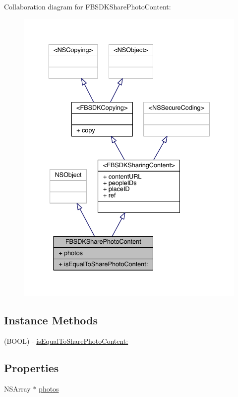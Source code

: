 Collaboration diagram for F\-B\-S\-D\-K\-Share\-Photo\-Content\-:
\nopagebreak
\begin{figure}[H]
\begin{center}
\leavevmode
\includegraphics[width=336pt]{interface_f_b_s_d_k_share_photo_content__coll__graph}
\end{center}
\end{figure}
\subsection*{Instance Methods}
\begin{DoxyCompactItemize}
\item 
(B\-O\-O\-L) -\/ \hyperlink{interface_f_b_s_d_k_share_photo_content_ace81b33c5411764eaa3fe442f533c34f}{is\-Equal\-To\-Share\-Photo\-Content\-:}
\end{DoxyCompactItemize}
\subsection*{Properties}
\begin{DoxyCompactItemize}
\item 
N\-S\-Array $\ast$ \hyperlink{interface_f_b_s_d_k_share_photo_content_a25922cdf4c382a13ebc748c8f2b0eba3}{photos}
\end{DoxyCompactItemize}


